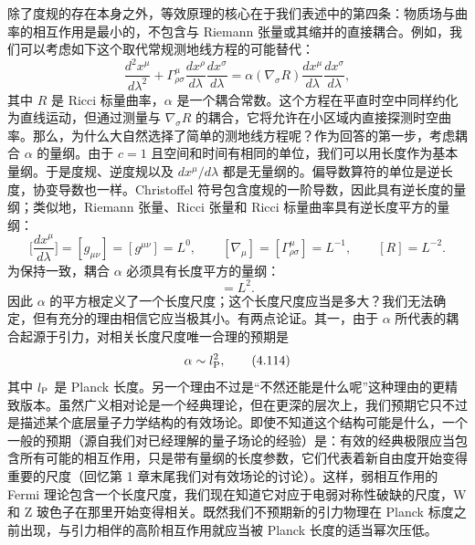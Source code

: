 除了度规的存在本身之外，等效原理的核心在于我们表述中的第四条：物质场与曲率的相互作用是最小的，不包含与 Riemann 张量或其缩并的直接耦合。例如，我们可以考虑如下这个取代常规测地线方程的可能替代：
\begin{equation*}
\frac{d^2x^\mu}{d\lambda^2} + \Gamma^\mu_{\rho\sigma}\frac{dx^\rho}{d\lambda}\frac{dx^\sigma}{d\lambda} = \alpha\left(\nabla_\sigma R\right)\frac{dx^\mu}{d\lambda}\frac{dx^\sigma}{d\lambda},
\tag{4.111}
\end{equation*}
其中 $R$ 是 Ricci 标量曲率，$\alpha$ 是一个耦合常数。这个方程在平直时空中同样约化为直线运动，但通过测量与 $\nabla_\sigma R$ 的耦合，它将允许在小区域内直接探测时空曲率。那么，为什么大自然选择了简单的测地线方程呢？作为回答的第一步，考虑耦合 $\alpha$ 的量纲。由于 $c = 1$ 且空间和时间有相同的单位，我们可以用长度作为基本量纲。于是度规、逆度规以及 $dx^\mu/d\lambda$ 都是无量纲的。偏导数算符的单位是逆长度，协变导数也一样。Christoffel 符号包含度规的一阶导数，因此具有逆长度的量纲；类似地，Riemann 张量、Ricci 张量和 Ricci 标量曲率具有逆长度平方的量纲：
\begin{equation*}
\Big[\frac{dx^\mu}{d\lambda}\Big] = [g_{\mu\nu}] = [g^{\mu\nu}] = L^0, \qquad [\nabla_\mu] = [\Gamma^\mu_{\rho\sigma}] = L^{-1}, \qquad [R] = L^{-2}.
\tag{4.112}
\end{equation*}
为保持一致，耦合 $\alpha$ 必须具有长度平方的量纲：
\begin{equation*}
[\alpha] = L^2.
\tag{4.113}
\end{equation*}
因此 $\alpha$ 的平方根定义了一个长度尺度；这个长度尺度应当是多大？我们无法确定，但有充分的理由相信它应当极其小。有两点论证。其一，由于 $\alpha$ 所代表的耦合起源于引力，对相关长度尺度唯一合理的预期是
\begin{equation*}
\alpha \sim l_{\rm P}^2,
\tag{4.114}
\end{equation*}
其中 $l_{\rm P}$ 是 Planck 长度。另一个理由不过是“不然还能是什么呢”这种理由的更精致版本。虽然广义相对论是一个经典理论，但在更深的层次上，我们预期它只不过是描述某个底层量子力学结构的有效场论。即使不知道这个结构可能是什么，一个一般的预期（源自我们对已经理解的量子场论的经验）是：有效的经典极限应当包含所有可能的相互作用，只是带有量纲的长度参数，它们代表着新自由度开始变得重要的尺度（回忆第 1 章末尾我们对有效场论的讨论）。这样，弱相互作用的 Fermi 理论包含一个长度尺度，我们现在知道它对应于电弱对称性破缺的尺度，W 和 Z 玻色子在那里开始变得相关。既然我们不预期新的引力物理在 Planck 标度之前出现，与引力相伴的高阶相互作用就应当被 Planck 长度的适当幂次压低。

